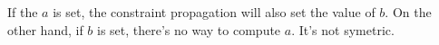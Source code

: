 \documentclass[a4paper,12pt]{article}
\begin{document}
If the $a$ is set, the constraint propagation will also set the value
of $b$.  On the other hand, if $b$ is set,  there's no way to compute
$a$.  It's not symetric.
\end{document}
